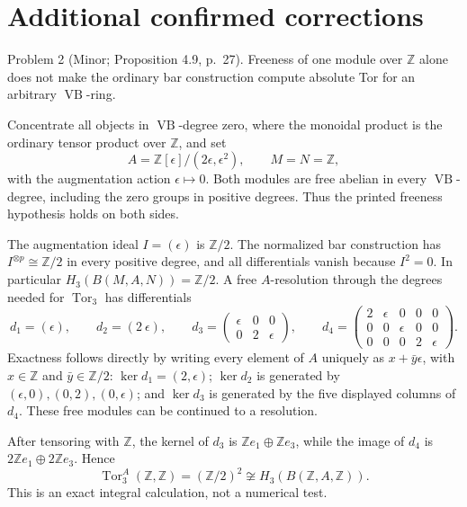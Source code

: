 \documentclass[10pt]{article}
\begin{document}
\section*{Additional confirmed corrections}
Problem 2 (Minor; Proposition 4.9, p. 27).  Freeness of one module over \(\mathbb Z\) alone does not make the ordinary bar construction compute absolute Tor for an arbitrary \(\operatorname{VB}\)-ring.\par
Concentrate all objects in \(\operatorname{VB}\)-degree zero, where the monoidal product is the ordinary tensor product over \(\mathbb Z\), and set \[A=\mathbb Z[\epsilon]/(2\epsilon,\epsilon^2),\qquad M=N=\mathbb Z,\] with the augmentation action \(\epsilon\mapsto0\). Both modules are free abelian in every \(\operatorname{VB}\)-degree, including the zero groups in positive degrees. Thus the printed freeness hypothesis holds on both sides.\par
The augmentation ideal \(I=(\epsilon)\) is \(\mathbb Z/2\). The normalized bar construction has \(I^{\otimes p}\cong\mathbb Z/2\) in every positive degree, and all differentials vanish because \(I^2=0\). In particular \(H_3(B(M,A,N))=\mathbb Z/2\). A free \(A\)-resolution through the degrees needed for \(\operatorname{Tor}_3\) has differentials \[d_1=(\epsilon),\qquad d_2=(2\ \epsilon),\qquad
 d_3=\begin{pmatrix}\epsilon&0&0\\0&2&\epsilon\end{pmatrix},
 \qquad
 d_4=\begin{pmatrix}
 2&\epsilon&0&0&0\\0&0&\epsilon&0&0\\0&0&0&2&\epsilon
 \end{pmatrix}.\] Exactness follows directly by writing every element of \(A\) uniquely as \(x+\bar y\epsilon\), with \(x\in\mathbb Z\) and \(\bar y\in\mathbb Z/2\): \(\ker d_1=(2,\epsilon)\); \(\ker d_2\) is generated by \((\epsilon,0),(0,2),(0,\epsilon)\); and \(\ker d_3\) is generated by the five displayed columns of \(d_4\). These free modules can be continued to a resolution.\par
After tensoring with \(\mathbb Z\), the kernel of \(d_3\) is \(\mathbb Ze_1\oplus\mathbb Ze_3\), while the image of \(d_4\) is \(2\mathbb Ze_1\oplus2\mathbb Ze_3\). Hence \[\operatorname{Tor}^A_3(\mathbb Z,\mathbb Z)=(\mathbb Z/2)^2
 \not\cong H_3(B(\mathbb Z,A,\mathbb Z)).\] This is an exact integral calculation, not a numerical test.\par
\end{document}
